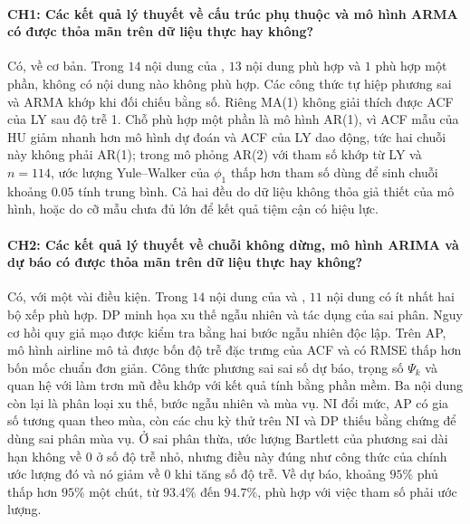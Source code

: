 \paragraph{CH1: Các kết quả lý thuyết về cấu trúc phụ thuộc và mô hình ARMA có được thỏa mãn trên dữ liệu thực hay không?}
Có, về cơ bản. Trong $14$ nội dung của , $13$ nội dung phù hợp và $1$ phù hợp một phần, không có nội dung nào không phù hợp. Các công thức tự hiệp phương sai và ARMA khớp khi đối chiếu bằng số. Riêng MA(1) không giải thích được ACF của LY sau độ trễ 1. Chỗ phù hợp một phần là mô hình AR(1), vì ACF mẫu của HU giảm nhanh hơn mô hình dự đoán và ACF của LY dao động, tức hai chuỗi này không phải AR(1); trong mô phỏng AR(2) với tham số khớp từ LY và $n=114$, ước lượng Yule--Walker của $\phi_1$ thấp hơn tham số dùng để sinh chuỗi khoảng $0.05$ tính trung bình. Cả hai đều do dữ liệu không thỏa giả thiết của mô hình, hoặc do cỡ mẫu chưa đủ lớn để kết quả tiệm cận có hiệu lực.

\paragraph{CH2: Các kết quả lý thuyết về chuỗi không dừng, mô hình ARIMA và dự báo có được thỏa mãn trên dữ liệu thực hay không?}
Có, với một vài điều kiện. Trong $14$ nội dung của  và , $11$ nội dung có ít nhất hai bộ xếp phù hợp. DP minh họa xu thế ngẫu nhiên và tác dụng của sai phân. Nguy cơ hồi quy giả mạo được kiểm tra bằng hai bước ngẫu nhiên độc lập. Trên AP, mô hình airline mô tả được bốn độ trễ đặc trưng của ACF và có RMSE thấp hơn bốn mốc chuẩn đơn giản. Công thức phương sai sai số dự báo, trọng số $\Psi_k$ và quan hệ với làm trơn mũ đều khớp với kết quả tính bằng phần mềm. Ba nội dung còn lại là phân loại xu thế, bước ngẫu nhiên và mùa vụ. NI đổi mức, AP có gia số tương quan theo mùa, còn các chu kỳ thử trên NI và DP thiếu bằng chứng để dùng sai phân mùa vụ. Ở sai phân thừa, ước lượng Bartlett của phương sai dài hạn không về $0$ ở số độ trễ nhỏ, nhưng điều này đúng như công thức của chính ước lượng đó và nó giảm về $0$ khi tăng số độ trễ. Về dự báo, khoảng $95\%$ phủ thấp hơn $95\%$ một chút, từ $93.4\%$ đến $94.7\%$, phù hợp với việc tham số phải ước lượng.

